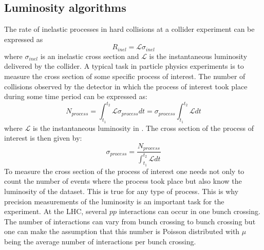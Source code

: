 


\subsection{Luminosity algorithms}
The rate of inelastic processes in hard collisions at a collider experiment can be expressed as
\begin{equation}
R_{inel} = \mathscr{L} \sigma_{inel}
\label{eq:simpleLumi}
\end{equation}
where $\sigma_{inel}$ is an inelastic cross section and $\mathscr{L}$ is the instantaneous luminosity delivered by the collider.
A typical task in particle physics experiments is to measure the cross section of some specific process of interest.
The number of collisions observed by the detector in which the process of interest took place during some time period can be expressed as:
\begin{equation}
N_{process} = \int_{t_{1}}^{t_{2}} \mathscr{L} \sigma_{process} dt = \sigma_{process} \int_{t_{1}}^{t_{2}} \mathscr{L} dt
\label{eq:simpleLumi2}
\end{equation}
where $\mathscr{L}$ is the instantaneous luminosity in .
The cross section of the process of interest is then given by:
\begin{equation}
\sigma_{process} = \dfrac{N_{process}}{  \int_{t_{1}}^{t_{2}} \mathscr{L} dt}
\label{eq:sigma_proc}
\end{equation}
To measure the cross section of the process of interest one needs not only to count the number of events where the process took place but also know the luminosity of the dataset.
This is true for any type of process. 
This is why precision measurements of the luminosity is an important task for the experiment.
At the LHC, several $pp$ interactions can occur in one bunch crossing. 
The number of interactions can vary from bunch crossing to bunch crossing but one can make the assumption that this number is Poisson distributed 
with $\mu$ being the average number of interactions per bunch crossing.
